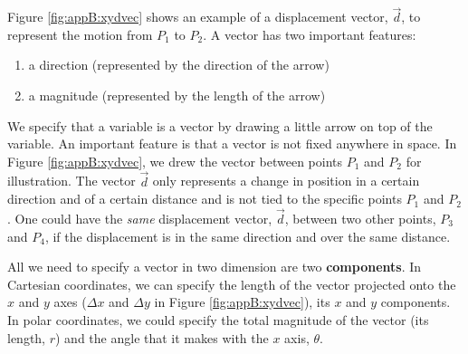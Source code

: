 Figure \ref{fig:appB:xydvec} shows an example of a displacement vector, $\vec d$, to represent the motion from $P_1$ to $P_2$. A vector has two important features:
\begin{enumerate}
\item a direction (represented by the direction of the arrow)
\item a magnitude (represented by the length of the arrow)
\end{enumerate}
We specify that a variable is a vector by drawing a little arrow on top of the variable. An important feature is that a vector is not fixed anywhere in space. In Figure \ref{fig:appB:xydvec}, we drew the vector between points $P_1$ and $P_2$ for illustration. The vector $\vec d$ only represents a change in position in a certain direction and of a certain distance and is not tied to the specific points $P_1$ and $P_2$. One could have the \textit{same} displacement vector, $\vec d$, between two other points, $P_3$ and $P_4$, if the displacement is in the same direction and over the same distance. 

All we need to specify a vector in two dimension are two \textbf{components}. In Cartesian coordinates, we can specify the length of the vector projected onto the $x$ and $y$ axes ($\Delta x$ and $\Delta y$ in Figure \ref{fig:appB:xydvec}), its $x$ and $y$ components. In polar coordinates, we could specify the total magnitude of the vector (its length, $r$) and the angle that it makes with the $x$ axis, $\theta$.

